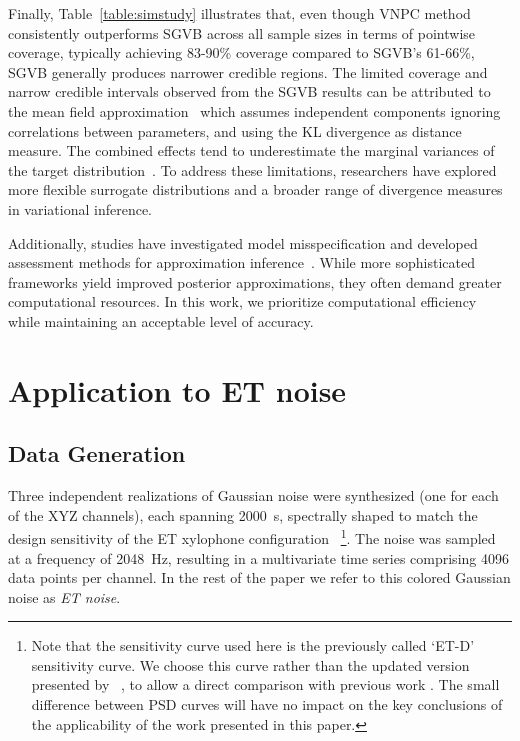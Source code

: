 \documentclass[%
 reprint,
 amsmath,amssymb,
 aps,
 nofootinbib,
]{revtex4-2}
\begin{document}
Finally, Table~\ref{table:simstudy} illustrates that, even though VNPC method consistently outperforms SGVB across all sample sizes in terms of pointwise coverage, typically achieving 83-90\% coverage compared to SGVB's 61-66\%, SGVB generally produces narrower credible regions.
%
The limited coverage and narrow credible intervals observed from the SGVB results can be attributed to the mean field approximation~\cite{Blei2017} which assumes independent components ignoring correlations between parameters, and using the KL divergence as distance measure. 
The combined effects tend to underestimate the marginal variances of the target distribution~\cite{Blei2006,Wang2005}. 
To address these limitations, researchers have explored more flexible surrogate distributions and a broader range of divergence measures in variational inference\cite{Kingma2013, Blei2017, Rezende2015,Yang2020,Higgins2017}. 

Additionally, studies have investigated model misspecification and developed assessment methods for approximation inference~\cite{Wang2019, yao2018, lee2019, yu2021}.
While more sophisticated frameworks yield improved posterior approximations, they often demand greater computational resources. 
In this work, we prioritize computational efficiency while maintaining an acceptable level of accuracy.



\section{Application to ET noise}
\label{sec:application}
\subsection{Data Generation}
\label{sec:data_gen}


Three independent realizations of Gaussian noise were synthesized (one for each of the XYZ channels), each spanning \SI{2000}{\second}, spectrally shaped to match the design sensitivity of the ET xylophone configuration~\cite{Hild_2009,Hild:2010id} 
\footnote{Note that the sensitivity curve used here is the previously called `ET-D' sensitivity curve. We choose this curve rather than the updated version presented by ~\citet{Branchesi:2023mws}, to allow a direct comparison with previous work \cite{Janssens2023}. 
The small difference between PSD curves will have no impact on the key conclusions of the applicability of the work presented in this paper.
}.
The noise was sampled at a frequency of \SI{2048}{Hz}, resulting in a multivariate time series comprising \SI{4096}{\kilo} data points per channel. 
In the rest of the paper we refer to this colored Gaussian noise as \textit{ET noise}.
\end{document}
